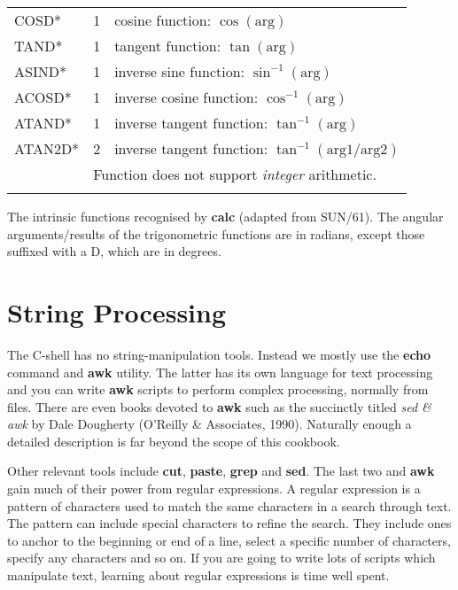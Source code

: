 \documentclass[twoside,11pt]{article}
\newcommand{\htmlref}[2]{#1}
\newcommand{\xlabel}[1]{}
\begin{document}
\begin{center}
\begin{tabular}{lcl}
COSD* & 1 & cosine function: $\cos (\mbox{arg})$ \\
TAND* & 1 & tangent function: $\tan (\mbox{arg})$ \\
ASIND* & 1 & inverse sine function: $\sin ^{-1}(\mbox{arg})$ \\
ACOSD* & 1 & inverse cosine function: $\cos ^{-1}(\mbox{arg})$ \\
ATAND* & 1 & inverse tangent function: $\tan ^{-1}(\mbox{arg})$ \\
ATAN2D* & 2 & inverse tangent function: $\tan ^{-1}(\mbox{arg1/arg2})$ \\
\multicolumn{1}{r}{} &
\multicolumn{2}{l}{\footnotesize *Function does not support {\em integer}
arithmetic.}\\
\\ \hline
\end{tabular}
\end{center}
The intrinsic functions recognised by {\bf calc} (adapted from SUN/61).
The angular arguments/results of the trigonometric functions are in
radians, except those suffixed with a D, which are in degrees.
\label{sc4_table:intrinsics}

\newpage
\section{\xlabel{sc4_se_string_proc}String Processing
\label{sc4_se_string_proc}}

The C-shell has no string-manipulation tools.  Instead we mostly use
the {\bf echo} command and {\bf awk} utility.  The latter has its own
language for text processing and you can write {\bf awk} scripts to
perform complex processing, normally from files.  There are even books
devoted to {\bf awk} such as the succinctly titled {\sl sed \& awk} by
Dale Dougherty (O'Reilly \& Associates, 1990).  Naturally enough a
detailed description is far beyond the scope of this cookbook.

Other relevant tools include {\bf cut}, {\bf paste}, {\bf grep} and
{\bf sed}.  The last two and {\bf awk} gain much of their power from
\htmlref{regular expressions}{sc4_gl_reg_exp}.  A regular expression
is a pattern of characters used to match the same characters in a
search through text.  The pattern can include special characters to
refine the search.  They include ones to anchor to the beginning or
end of a line, select a specific number of characters, specify any
characters and so on.  If you are going to write lots of scripts which
manipulate text, learning about regular expressions is time well
spent.
\end{document}
